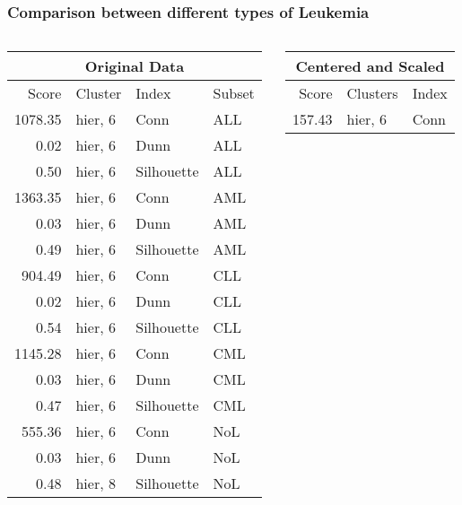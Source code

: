 \documentclass[10pt,dvipsnames,table, handout]{beamer} %
\begin{document}
\begin{frame}
\frametitle{Comparison between different types of Leukemia}
\begin{columns}
\begin{column}{.5\textwidth}
\begin{table}[ht]
\centering
{\footnotesize
{}
\begin{tabular}{rlll}
\hline
\multicolumn{4}{c}{Original Data} \\
  \hline
 Score & Cluster & Index & Subset \\ 
  \hline
  1078.35 & hier, 6 & Conn & ALL \\ 
  0.02 & hier, 6 & Dunn & ALL \\ 
  0.50 & hier, 6 & Silhouette & ALL \\ 
  1363.35 & hier, 6 & Conn & AML \\ 
  0.03 & hier, 6 & Dunn & AML \\ 
  0.49 & hier, 6 & Silhouette & AML \\ 
  904.49 & hier, 6 & Conn & CLL \\ 
  0.02 & hier, 6 & Dunn & CLL \\ 
  0.54 & hier, 6 & Silhouette & CLL \\ 
  1145.28 & hier, 6 & Conn & CML \\ 
  0.03 & hier, 6 & Dunn & CML \\ 
  0.47 & hier, 6 & Silhouette & CML \\ 
  555.36 & hier, 6 & Conn & NoL \\ 
  0.03 & hier, 6 & Dunn & NoL \\ 
  0.48 & hier, 8 & Silhouette & NoL \\ 
   \hline
\end{tabular}
}
\end{table}
\end{column}
\begin{column}{.5\textwidth}
\pause
\begin{table}[ht]
\centering
{\footnotesize
{}
\begin{tabular}{rll}
\hline
\multicolumn{3}{c}{Centered and Scaled} \\
\hline
Score & Clusters & Index \\ 
  \hline
157.43 & hier, 6 & Conn \\ 

\end{tabular}}
\end{table}
\end{column}
\end{columns}
\end{frame}
\end{document}
